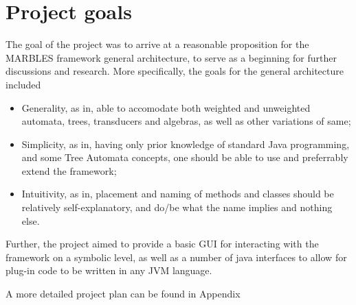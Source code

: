 \section{Project goals}

The goal of the project was to arrive at a reasonable proposition for the
MARBLES framework general architecture, to serve as a beginning for
further discussions and research. More specifically, the goals for the
general architecture included

\begin{itemize}
\item Generality, as in, able to accomodate both weighted and unweighted
automata, trees, transducers and algebras, as well as other variations of
same;
\item Simplicity, as in, having only prior knowledge of standard Java
programming, and some Tree Automata concepts, one should be able to use and
preferrably extend the framework;
\item Intuitivity, as in, placement and naming of methods and classes
should be relatively self-explanatory, and do/be what the name implies and
nothing else.
\end{itemize}

Further, the project aimed to provide a basic GUI for interacting with the
framework on a symbolic level, as well as a number of java interfaces to
allow for plug-in code to be written in any JVM language.

A more detailed project plan can be found in Appendix %





%
%
